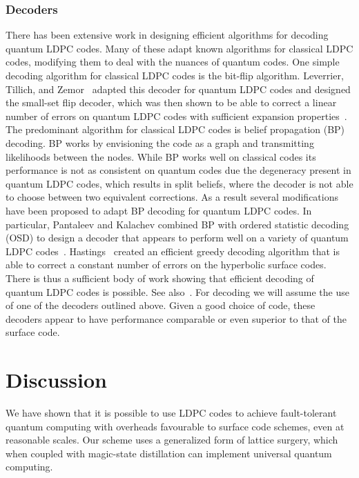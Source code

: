 \documentclass[reprint,
superscriptaddress,
 amsmath,amssymb,
 aps, longbibliography
]{revtex4-1}
\newcommand{\rev}[1]{{#1}}
\begin{document}
\subsubsection{\label{sec:decoding} Decoders}
There has been extensive work in designing efficient algorithms for decoding quantum LDPC codes. 
Many of these adapt known algorithms for classical LDPC codes, modifying them to deal with the nuances of quantum codes. 
One simple decoding algorithm for classical LDPC codes is the bit-flip algorithm. Leverrier, Tillich, and Zemor~\cite{Leverrier15} adapted this decoder for quantum LDPC codes and designed the small-set flip decoder, which was then shown to be able to correct a linear number of errors on quantum LDPC codes with sufficient expansion properties~\cite{Fawzi20}. The predominant algorithm for classical LDPC codes is belief propagation (BP) decoding. BP works by envisioning the code as a graph and transmitting likelihoods between the nodes. While BP works well on classical codes its performance is not as consistent on quantum codes due the degeneracy present in quantum LDPC codes, which results in split \rev{beliefs, where the decoder is not able to choose between two equivalent corrections}. As a result several modifications have been proposed to adapt BP decoding for quantum LDPC codes. In particular, Pantaleev and Kalachev combined BP with ordered statistic decoding (OSD) to design a decoder that appears to perform well on a variety of quantum LDPC codes~\cite{Panteleev19}. Hastings~\cite{Hastings14} created an efficient greedy decoding algorithm that is able to correct a constant number of errors on the hyperbolic surface codes. There is thus a sufficient body of work showing that efficient decoding of quantum LDPC codes is possible. See also~\cite{Breuckmann16,Breuckmann17,Breuckmann20}.
For decoding we will assume the use of one of the decoders outlined above. Given a good choice of code, these decoders appear to have performance comparable or even superior to that of the surface code.

\section{\label{sec:discussion} Discussion}
We have shown that it is possible to use LDPC codes to achieve fault-tolerant quantum computing with overheads favourable to surface code schemes, even at reasonable scales. Our scheme uses a generalized form of lattice surgery, which when coupled with magic-state distillation can implement universal quantum computing.
\end{document}
